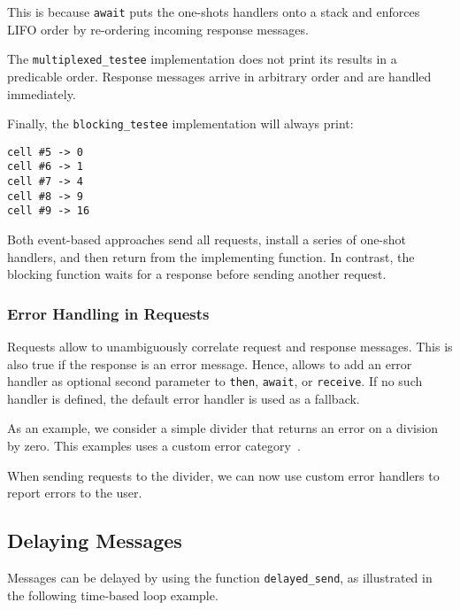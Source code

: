 This is because \lstinline^await^ puts the one-shots handlers onto a stack and enforces LIFO order by re-ordering incoming response messages.

The \lstinline^multiplexed_testee^ implementation does not print its results in a predicable order. Response messages arrive in arbitrary order and are handled immediately.

Finally, the \lstinline^blocking_testee^ implementation will always print:

{\footnotesize\begin{verbatim}
cell #5 -> 0
cell #6 -> 1
cell #7 -> 4
cell #8 -> 9
cell #9 -> 16
\end{verbatim}}

Both event-based approaches send all requests, install a series of one-shot handlers, and then return from the implementing function. In contrast, the blocking function waits for a response before sending another request.

\subsubsection{Error Handling in Requests}
\label{error-response}

Requests allow \lib to unambiguously correlate request and response messages. This is also true if the response is an error message. Hence, \lib allows to add an error handler as optional second parameter to \lstinline^then^, \lstinline^await^, or \lstinline^receive^. If no such handler is defined, the default error handler  is used as a fallback.

As an example, we consider a simple divider that returns an error on a division by zero. This examples uses a custom error category~.



When sending requests to the divider, we can now use custom error handlers to report errors to the user.



\clearpage
\subsection{Delaying Messages}
\label{delay-message}

Messages can be delayed by using the function \lstinline^delayed_send^, as illustrated in the following time-based loop example. 

